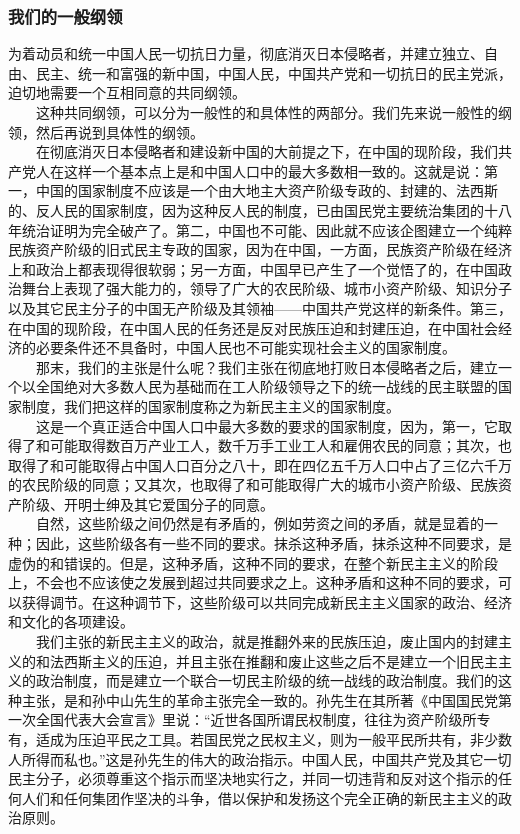 \documentclass[cn,11pt,chinese]{elegantbook}
\def\myformat#1{\hfil\hfil #1}
\begin{document}
\subsubsection*{\myformat{我们的一般纲领}}
为着动员和统一中国人民一切抗日力量，彻底消灭日本侵略者，并建立独立、自由、民主、统一和富强的新中国，中国人民，中国共产党和一切抗日的民主党派，迫切地需要一个互相同意的共同纲领。\\
　　这种共同纲领，可以分为一般性的和具体性的两部分。我们先来说一般性的纲领，然后再说到具体性的纲领。\\
　　在彻底消灭日本侵略者和建设新中国的大前提之下，在中国的现阶段，我们共产党人在这样一个基本点上是和中国人口中的最大多数相一致的。这就是说：第一，中国的国家制度不应该是一个由大地主大资产阶级专政的、封建的、法西斯的、反人民的国家制度，因为这种反人民的制度，已由国民党主要统治集团的十八年统治证明为完全破产了。第二，中国也不可能、因此就不应该企图建立一个纯粹民族资产阶级的旧式民主专政的国家，因为在中国，一方面，民族资产阶级在经济上和政治上都表现得很软弱；另一方面，中国早已产生了一个觉悟了的，在中国政治舞台上表现了强大能力的，领导了广大的农民阶级、城市小资产阶级、知识分子以及其它民主分子的中国无产阶级及其领袖——中国共产党这样的新条件。第三，在中国的现阶段，在中国人民的任务还是反对民族压迫和封建压迫，在中国社会经济的必要条件还不具备时，中国人民也不可能实现社会主义的国家制度。\\
　　那末，我们的主张是什么呢？我们主张在彻底地打败日本侵略者之后，建立一个以全国绝对大多数人民为基础而在工人阶级领导之下的统一战线的民主联盟的国家制度，我们把这样的国家制度称之为新民主主义的国家制度。\\
　　这是一个真正适合中国人口中最大多数的要求的国家制度，因为，第一，它取得了和可能取得数百万产业工人，数千万手工业工人和雇佣农民的同意；其次，也取得了和可能取得占中国人口百分之八十，即在四亿五千万人口中占了三亿六千万的农民阶级的同意；又其次，也取得了和可能取得广大的城市小资产阶级、民族资产阶级、开明士绅及其它爱国分子的同意。\\
　　自然，这些阶级之间仍然是有矛盾的，例如劳资之间的矛盾，就是显着的一种；因此，这些阶级各有一些不同的要求。抹杀这种矛盾，抹杀这种不同要求，是虚伪的和错误的。但是，这种矛盾，这种不同的要求，在整个新民主主义的阶段上，不会也不应该使之发展到超过共同要求之上。这种矛盾和这种不同的要求，可以获得调节。在这种调节下，这些阶级可以共同完成新民主主义国家的政治、经济和文化的各项建设。\\
　　我们主张的新民主主义的政治，就是推翻外来的民族压迫，废止国内的封建主义的和法西斯主义的压迫，并且主张在推翻和废止这些之后不是建立一个旧民主主义的政治制度，而是建立一个联合一切民主阶级的统一战线的政治制度。我们的这种主张，是和孙中山先生的革命主张完全一致的。孙先生在其所著《中国国民党第一次全国代表大会宣言》里说：“近世各国所谓民权制度，往往为资产阶级所专有，适成为压迫平民之工具。若国民党之民权主义，则为一般平民所共有，非少数人所得而私也。”这是孙先生的伟大的政治指示。中国人民，中国共产党及其它一切民主分子，必须尊重这个指示而坚决地实行之，并同一切违背和反对这个指示的任何人们和任何集团作坚决的斗争，借以保护和发扬这个完全正确的新民主主义的政治原则。\\
\end{document}
